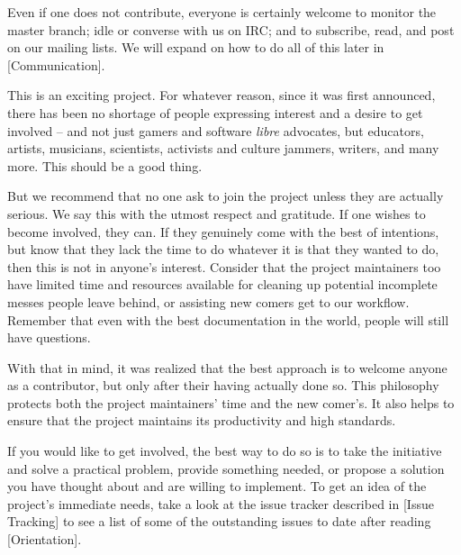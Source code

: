 Even if one does not contribute, everyone is certainly welcome to monitor the master branch; idle or converse with us on IRC; and to subscribe, read, and post on our mailing lists. We will expand on how to do all of this later in [Communication].

This is an exciting project. For whatever reason, since it was first announced, there has been no shortage of people expressing interest and a desire to get involved -- and not just gamers and software {\it libre} advocates, but educators, artists, musicians, scientists, activists and culture jammers, writers, and many more. This should be a good thing. 

But we recommend that no one ask to join the project unless they are actually serious. We say this with the utmost respect and gratitude. If one wishes to become involved, they can. If they genuinely come with the best of intentions, but know that they lack the time to do whatever it is that they wanted to do, then this is not in anyone's interest. Consider that the project maintainers too have limited time and resources available for cleaning up potential incomplete messes people leave behind, or assisting new comers get  to our workflow. Remember that even with the best documentation in the world, people will still have questions.

With that in mind, it was realized that the best approach is to welcome anyone as a contributor, but only after their having actually done so. This philosophy protects both the project maintainers' time and the new comer's. It also helps to ensure that the project maintains its productivity and high standards.

If you would like to get involved, the best way to do so is to take the initiative and solve a practical problem, provide something needed, or propose a solution you have thought about and are willing to implement. To get an idea of the project's immediate needs, take a look at the issue tracker described in [Issue Tracking] to see a list of some of the outstanding issues to date after reading [Orientation].

